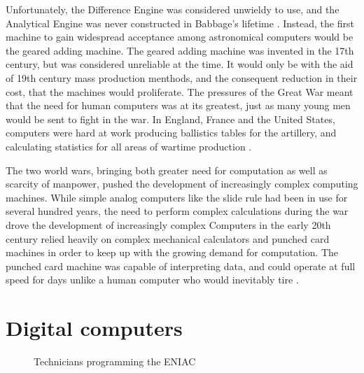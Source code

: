 \documentclass[../main.tex]{subfiles}
\begin{document}
Unfortunately, the Difference Engine was considered unwieldy to use, and the Analytical Engine was never constructed in Babbage's lifetime \cite{babbage1832}.
Instead, the first machine to gain widespread acceptance among astronomical computers would be the geared adding machine.
The geared adding machine was invented in the 17th century, but was considered unreliable at the time.
It would only be with the aid of 19th century mass production menthods, and the consequent reduction in their cost, that the machines would proliferate.
The pressures of the Great War meant that the need for human computers was at its greatest, just as many young men would be sent to fight in the war.
In England, France and the United States, computers were hard at work producing ballistics tables for the artillery, and calculating statistics for all areas of wartime production \cite{grier1955}.

The two world wars, bringing both greater need for computation as well as scarcity of manpower, pushed the development of increasingly complex computing machines.
While simple analog computers like the slide rule had been in use for several hundred years, the need to perform complex calculations during the war drove the development of increasingly complex
Computers in the early 20th century relied heavily on complex mechanical calculators and punched card machines in order to keep up with the growing demand for computation.
The punched card machine was capable of interpreting data, and could operate at full speed for days unlike a human computer who would inevitably tire \cite{carr}.


\section{Digital computers}

\begin{figure}[ht]
    \caption{Technicians programming the ENIAC}
    \label{fig:eniac}
\end{figure}
\end{document}
